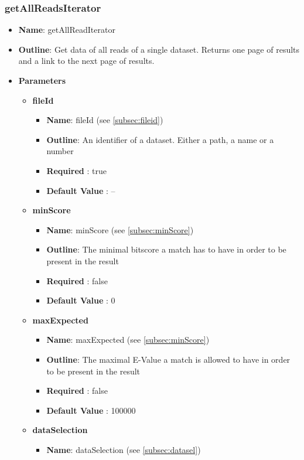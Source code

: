 \documentclass[11pt]{article}
\begin{document}
\subsubsection{getAllReadsIterator}
\begin{itemize}
	\item \textbf{Name}: getAllReadIterator
	\item \textbf{Outline}: Get data of all reads of a single dataset. Returns one page of results and a link to the next page of results.
	\item \textbf{Parameters}
		\begin{itemize}
			\item \textbf{fileId}		
				\begin{itemize}
					\item \textbf{Name}: fileId (see \ref{subsec:fileid})
					\item \textbf{Outline}: An identifier of a dataset. Either a path, a name or a number
					\item \textbf{Required} : true
					\item \textbf{Default Value} : --
				\end{itemize}
			\item \textbf{minScore}		
				\begin{itemize}
					\item \textbf{Name}: minScore (see \ref{subsec:minScore})
					\item \textbf{Outline}: The minimal bitscore a match has to have in order to be present in the result
					\item \textbf{Required} : false
					\item \textbf{Default Value} : 0
				\end{itemize}
			\item \textbf{maxExpected}		
				\begin{itemize}
					\item \textbf{Name}: maxExpected (see \ref{subsec:minScore})
					\item \textbf{Outline}: The maximal E-Value a match is allowed to have in order to be present in the result
					\item \textbf{Required} : false
					\item \textbf{Default Value} : 100000
				\end{itemize}
			\item \textbf{dataSelection}		
				\begin{itemize}
					\item \textbf{Name}: dataSelection (see \ref{subsec:datasel})

\end{itemize}
\end{itemize}
\end{itemize}
\end{document}
